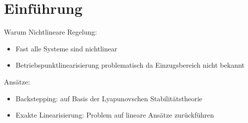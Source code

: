 \chapter{Einführung}
Warum Nichtlineare Regelung:
\begin{itemize}
    \item
        Fast alle Systeme sind nichtlinear
    \item
        Betriebspunktlinearisierung problematisch da Einzugsbereich nicht bekannt
\end{itemize}

Ansätze:
\begin{itemize}
    \item
        Backstepping: auf Basis der Lyapunovschen Stabilitätstheorie
    \item
        Exakte Linearisierung: Problem auf lineare Ansätze zurückführen
\end{itemize} 
